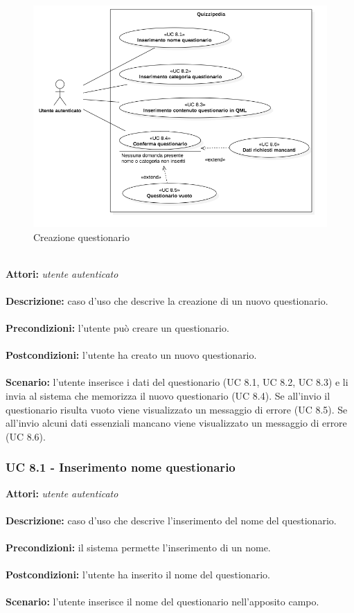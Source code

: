 \documentclass[a4paper,11pt]{article}
\begin{document}
\begin{figure}[h!]
\centering
\includegraphics[scale=0.6]{../immagini/UC8.png}
\caption{Creazione questionario}
\end{figure}
\ \\
\textbf{Attori:} \textit{utente autenticato}
\\ \\
\textbf{Descrizione:} caso d'uso che descrive la creazione di un nuovo questionario.\\
\\
\textbf{Precondizioni:} l'utente può creare un questionario.\\
\\
\textbf{Postcondizioni:} l’utente ha creato un nuovo questionario.\\
\\
\textbf{Scenario:} l’utente inserisce i dati del questionario (UC 8.1, UC 8.2, UC 8.3) e li invia al sistema che memorizza il nuovo questionario (UC 8.4). Se all'invio il questionario risulta vuoto viene visualizzato un messaggio di errore (UC 8.5). Se all'invio alcuni dati essenziali mancano viene visualizzato un messaggio di errore (UC 8.6).\\


\subsubsection{UC 8.1 - Inserimento nome questionario}

\textbf{Attori:} \textit{utente autenticato}
\\ \\
\textbf{Descrizione:} caso d'uso che descrive l'inserimento del nome del questionario.\\
\\
\textbf{Precondizioni:} il sistema permette l'inserimento di un nome.\\
\\
\textbf{Postcondizioni:} l’utente ha inserito il nome del questionario.\\
\\
\textbf{Scenario:} l’utente inserisce il nome del questionario nell'apposito campo.\\
\end{document}
